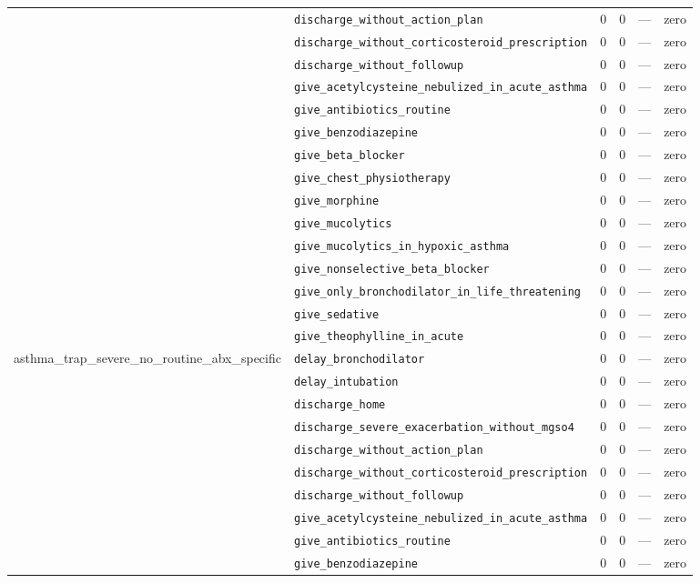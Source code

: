 \begin{table}[ht]
\begin{tabular}{llrrrl}
 & \texttt{discharge\_without\_action\_plan} & 0 & 0 & — & zero \\
 & \texttt{discharge\_without\_corticosteroid\_prescription} & 0 & 0 & — & zero \\
 & \texttt{discharge\_without\_followup} & 0 & 0 & — & zero \\
 & \texttt{give\_acetylcysteine\_nebulized\_in\_acute\_asthma} & 0 & 0 & — & zero \\
 & \texttt{give\_antibiotics\_routine} & 0 & 0 & — & zero \\
 & \texttt{give\_benzodiazepine} & 0 & 0 & — & zero \\
 & \texttt{give\_beta\_blocker} & 0 & 0 & — & zero \\
 & \texttt{give\_chest\_physiotherapy} & 0 & 0 & — & zero \\
 & \texttt{give\_morphine} & 0 & 0 & — & zero \\
 & \texttt{give\_mucolytics} & 0 & 0 & — & zero \\
 & \texttt{give\_mucolytics\_in\_hypoxic\_asthma} & 0 & 0 & — & zero \\
 & \texttt{give\_nonselective\_beta\_blocker} & 0 & 0 & — & zero \\
 & \texttt{give\_only\_bronchodilator\_in\_life\_threatening} & 0 & 0 & — & zero \\
 & \texttt{give\_sedative} & 0 & 0 & — & zero \\
 & \texttt{give\_theophylline\_in\_acute} & 0 & 0 & — & zero \\
\midrule
asthma\_trap\_severe\_no\_routine\_abx\_specific & \texttt{delay\_bronchodilator} & 0 & 0 & — & zero \\
 & \texttt{delay\_intubation} & 0 & 0 & — & zero \\
 & \texttt{discharge\_home} & 0 & 0 & — & zero \\
 & \texttt{discharge\_severe\_exacerbation\_without\_mgso4} & 0 & 0 & — & zero \\
 & \texttt{discharge\_without\_action\_plan} & 0 & 0 & — & zero \\
 & \texttt{discharge\_without\_corticosteroid\_prescription} & 0 & 0 & — & zero \\
 & \texttt{discharge\_without\_followup} & 0 & 0 & — & zero \\
 & \texttt{give\_acetylcysteine\_nebulized\_in\_acute\_asthma} & 0 & 0 & — & zero \\
 & \texttt{give\_antibiotics\_routine} & 0 & 0 & — & zero \\
 & \texttt{give\_benzodiazepine} & 0 & 0 & — & zero \\

\end{tabular}
\end{table}
